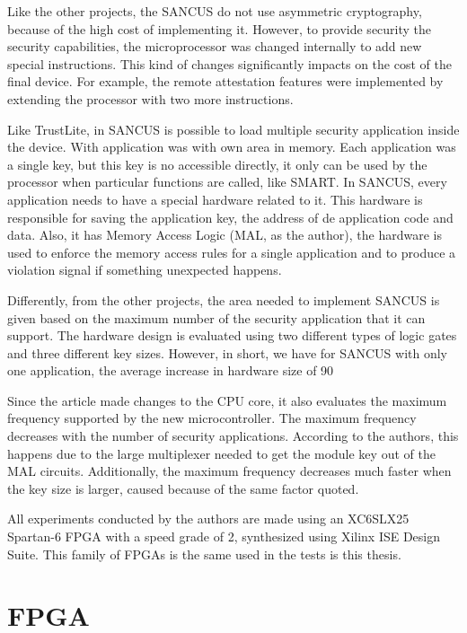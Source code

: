 Like the other projects, the SANCUS do not use asymmetric cryptography, because of the high cost of implementing it. However, to provide security the security capabilities, the microprocessor was changed internally to add new special instructions. This kind of changes significantly impacts on the cost of the final device. For example, the remote attestation features were implemented by extending the processor with two more instructions.

Like TrustLite, in SANCUS is possible to load multiple security application inside the device. With application was with own area in memory. Each application was a single key, but this key is no accessible directly, it only can be used by the processor when particular functions are called, like SMART. In SANCUS, every application needs to have a special hardware related to it. This hardware is responsible for saving the application key, the address of de application code and data. Also, it has Memory Access Logic (MAL, as the author), the hardware is used to enforce the memory access rules for a single application and to produce a violation signal if something unexpected happens. 

Differently, from the other projects, the area needed to implement SANCUS is given based on the maximum number of the security application that it can support. The hardware design is evaluated using two different types of logic gates and  three different key sizes. However, in short, we have for SANCUS with only one application, the average increase in hardware size of  90%

Since the article made changes to the CPU core, it also evaluates the maximum frequency supported by the new microcontroller. The maximum frequency decreases with the number of security applications.  According to the authors, this happens due to the large multiplexer needed to get the module key out of the MAL circuits. Additionally, the maximum frequency decreases much faster when the key size is larger, caused because of the same factor quoted.

All experiments conducted by the authors are made using an XC6SLX25 Spartan-6 FPGA with a speed grade of 2, synthesized using Xilinx ISE Design Suite. This family of FPGAs is the same used in the tests is this thesis. 

\section{FPGA}
\label{fpga}

